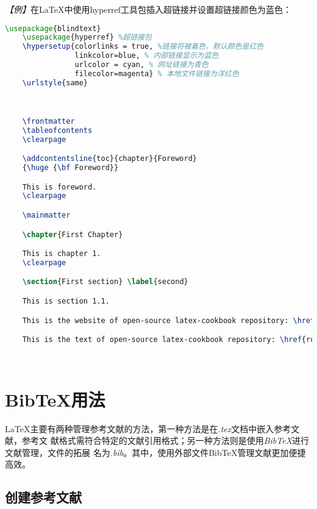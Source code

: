 \emph{【例】}在LaTeX中使用hyperref工具包插入超链接并设置超链接颜色为蓝色：
\begin{lstlisting}[language=TeX]
    \usepackage{blindtext}
    \usepackage{hyperref} %超链接包
    \hypersetup{colorlinks = true, %链接将被着色，默认颜色是红色
                linkcolor=blue, % 内部链接显示为蓝色
                urlcolor = cyan, % 网址链接为青色
                filecolor=magenta} % 本地文件链接为洋红色
    \urlstyle{same}

    

    \frontmatter
    \tableofcontents
    \clearpage

    \addcontentsline{toc}{chapter}{Foreword}
    {\huge {\bf Foreword}}

    This is foreword.
    \clearpage

    \mainmatter

    \chapter{First Chapter}

    This is chapter 1.
    \clearpage

    \section{First section} \label{second}

    This is section 1.1.

    This is the website of open-source latex-cookbook repository: \href{https://github.com/xinychen/latex-cookbook}{LaTeX-cookbook} or go to the next url: \url{https://github.com/xinychen/latex-cookbook}.

    This is the text of open-source latex-cookbook repository: \href{run:./LaTeX-cookbook.dox}{LaTeX-cookbook} 

    
\end{lstlisting}

\section{BibTeX用法}

LaTeX主要有两种管理参考文献的方法，第一种方法是在\emph{.tex}文档中嵌入参考文献，参考文
献格式需符合特定的文献引用格式；另一种方法则是使用\emph{BibTeX}进行文献管理，文件的拓展
名为\emph{.bib}。其中，使用外部文件BibTeX管理文献更加便捷高效。

\subsection{创建参考文献}

